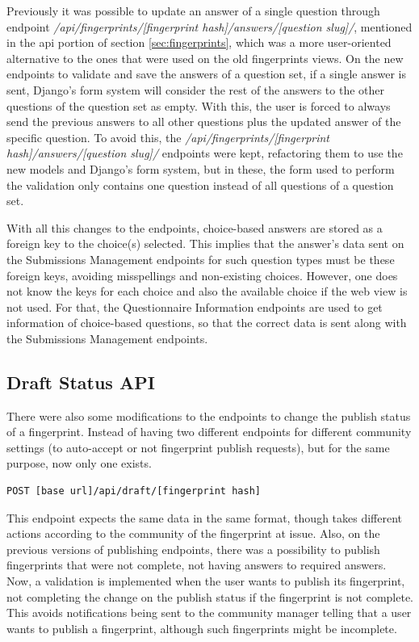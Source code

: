 Previously it was possible to update an answer of a single question through endpoint \textit{/api/fingerprints/[fingerprint hash]/answers/[question slug]/}, mentioned in the \gls{api} portion of section \ref{sec:fingerprints}, which was a more user-oriented alternative to the ones that were used on the old fingerprints views.
On the new endpoints to validate and save the answers of a question set, if a single answer is sent, Django's form system will consider the rest of the answers to the other questions of the question set as empty.
With this, the user is forced to always send the previous answers to all other questions plus the updated answer of the specific question.
To avoid this, the \textit{/api/fingerprints/[fingerprint hash]/answers/[question slug]/} endpoints were kept, refactoring them to use the new models and Django's form system, but in these, the form used to perform the validation only contains one question instead of all questions of a question set.

With all this changes to the endpoints, choice-based answers are stored as a foreign key to the choice(s) selected.
This implies that the answer's data sent on the Submissions Management endpoints for such question types must be these foreign keys, avoiding misspellings and non-existing choices.
However, one does not know the keys for each choice and also the available choice if the web view is not used.
For that, the Questionnaire Information endpoints are used to get information of choice-based questions, so that the correct data is sent along with the Submissions Management endpoints.

\subsection*{Draft Status API}

There were also some modifications to the endpoints to change the publish status of a fingerprint.
Instead of having two different endpoints for different community settings (to auto-accept or not fingerprint publish requests), but for the same purpose, now only one exists.

\begin{verbatim}
POST [base url]/api/draft/[fingerprint hash]
\end{verbatim}

This endpoint expects the same data in the same format, though takes different actions according to the community of the fingerprint at issue.
Also, on the previous versions of publishing endpoints, there was a possibility to publish fingerprints that were not complete, not having answers to required answers.
Now, a validation is implemented when the user wants to publish its fingerprint, not completing the change on the publish status if the fingerprint is not complete.
This avoids notifications being sent to the community manager telling that a user wants to publish a fingerprint, although such fingerprints might be incomplete.

